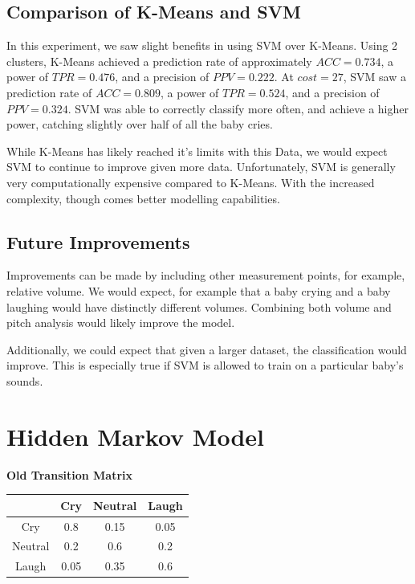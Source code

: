 \documentclass[paper=a4, fontsize=11pt]{scrartcl}
\numberwithin{equation}{section}
\numberwithin{figure}{section}
\numberwithin{table}{section}
\begin{document}
\subsection{Comparison of K-Means and SVM}
In this experiment, we saw slight benefits in using SVM over K-Means. Using 2 clusters, K-Means achieved a prediction rate of approximately $ACC = 0.734$, a power of $TPR = 0.476$, and a precision of $PPV = 0.222$. At $cost = 27$, SVM saw a prediction rate of $ACC = 0.809$, a power of $TPR = 0.524$, and a precision of $PPV = 0.324$. SVM was able to correctly classify more often, and achieve a higher power, catching slightly over half of all the baby cries.

While K-Means has likely reached it's limits with this Data, we would expect SVM to continue to improve given more data. Unfortunately, SVM is generally very computationally expensive compared to K-Means. With the increased complexity, though comes better modelling capabilities.

\subsection{Future Improvements}
Improvements can be made by including other measurement points, for example, relative volume. We would expect, for example that a baby crying and a baby laughing would have distinctly different volumes. Combining both volume and pitch analysis would likely improve the model.

Additionally, we could expect that given a larger dataset, the classification would improve. This is especially true if SVM is allowed to train on a particular baby's sounds.

\section{Hidden Markov Model} 

\centering \textbf{Old Transition Matrix}
\begin{center}
\begin{tabular}{ |c|c|c|c| } 
 \hline
       & Cry & Neutral & Laugh \\
 \hline
 Cry & 0.8 & 0.15 & 0.05 \\ 
 Neutral & 0.2 & 0.6 & 0.2 \\ 
 Laugh & 0.05 & 0.35 & 0.6 \\
 \hline
\end{tabular}
\end{center}
\end{document}
